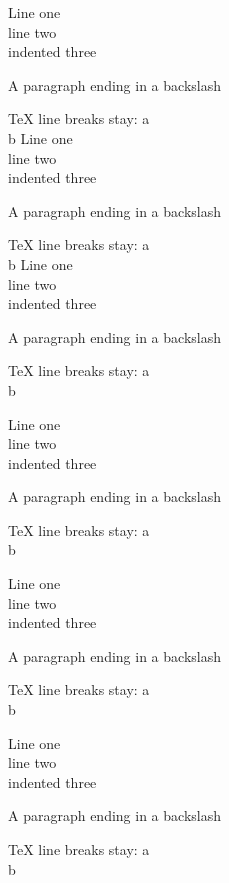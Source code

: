 Line one\\
line two\\
  indented three

A paragraph ending in a backslash\

TeX line breaks stay: a\\
b
Line one\\
line two\\
  indented three

A paragraph ending in a backslash\

TeX line breaks stay: a\\
b
Line one\\
line two\\
  indented three

A paragraph ending in a backslash\

TeX line breaks stay: a\\
b
\begin{frame}[t]
Line one\\
line two\\
  indented three

A paragraph ending in a backslash\

TeX line breaks stay: a\\
b
\end{frame}

\begin{frame}[t]
Line one\\
line two\\
  indented three

A paragraph ending in a backslash\

TeX line breaks stay: a\\
b
\end{frame}

\begin{frame}[t]
Line one\\
line two\\
  indented three

A paragraph ending in a backslash\

TeX line breaks stay: a\\
b
\end{frame}

